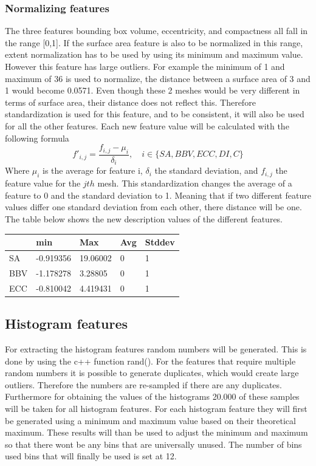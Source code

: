 \documentclass{bigdata}
\begin{document}
\subsubsection{Normalizing  features}
The three features bounding box volume, eccentricity, and compactness all fall in the range [0,1]. If the surface area feature is also to be normalized in this range, extent normalization has to be used by using its minimum and maximum value. However this feature has large outliers. For example the minimum of 1 and maximum of 36 is used to normalize, the distance between a surface area of 3 and 1 would become 0.0571. Even though these 2 meshes would be very different in terms of surface area, their distance does not reflect this. Therefore standardization is used for this feature, and to be consistent, it will also be used for all the other  features. 
Each new feature value will be calculated with the following formula
\begin{equation}
f'_{i,j} = \frac{f_{i,j} - \mu_i}{\delta_i},\quad i \in \{SA,BBV,ECC,DI,C\}
\end{equation}
Where $\mu_i$ is the average for feature i, $\delta_i$ the standard deviation, and $f_{i,j}$ the feature value for the $jth$ mesh. This standardization changes  the average of a feature to 0 and the standard deviation to 1. Meaning that if two different feature values differ one standard deviation from each other, there distance will be one. The table below shows the new description values of the different  features.

\begin{center}
    \begin{tabular}{ | l | l | l | l | l |}
    \hline
    & min & Max & Avg & Stddev \\ \hline
    SA & -0.919356 & 19.06002 & 0 & 1 \\ \hline
    BBV & -1.178278 & 3.28805 & 0 & 1 \\ \hline
    ECC & -0.810042 & 4.419431 & 0 & 1 \\ \hline
    \end{tabular}
\end{center}

\subsection{Histogram features}
For extracting the histogram features random numbers will be generated. This is done by using the c++ function rand(). For the features that require multiple random numbers it is possible to generate duplicates, which would create large outliers. Therefore the numbers are re-sampled if there are any duplicates. Furthermore for obtaining the values of the histograms 20.000 of these samples will be taken for all histogram features.
For each histogram feature they will first be generated using a minimum and maximum value based on their theoretical maximum. These results will than be used to adjust the minimum and maximum so that there wont be any bins that are universally unused. The number of bins used bins that will finally be used is set at 12.
\end{document}
